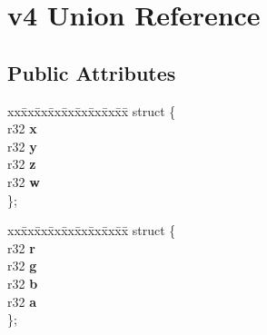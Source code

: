 \hypertarget{unionv4}{}\section{v4 Union Reference}
\label{unionv4}
\subsection*{Public Attributes}
\begin{DoxyCompactItemize}
\item 
\mbox{\label{unionv4_a963bc0946c0501381cd328461d5dbf99}} 
\begin{tabbing}
xx\=xx\=xx\=xx\=xx\=xx\=xx\=xx\=xx\=\kill
struct \{\\
\mbox{\label{unionv4_ad00dfb19fb170f64633ba38f8e05003c}} 
r32 {\bfseries x}\\
\mbox{\label{unionv4_a24527d2de19d9bd5f6a4d40cc74642ed}} 
r32 {\bfseries y}\\
\mbox{\label{unionv4_a9e524c0c55d5a00c3bb38a40ae09d89c}} 
r32 {\bfseries z}\\
\mbox{\label{unionv4_a94a432a243ae558de52da0cb34231152}} 
r32 {\bfseries w}\\
\}; \\

\end{tabbing}\item 
\mbox{\label{unionv4_aaf52d9980c797b6b3d980647e037b8bb}} 
\begin{tabbing}
xx\=xx\=xx\=xx\=xx\=xx\=xx\=xx\=xx\=\kill
struct \{\\
\mbox{\label{unionv4_a5443cce98e343c825d56f0ef357d03f6}} 
r32 {\bfseries r}\\
\mbox{\label{unionv4_aa57338767ef05342ad215cf4f55bad17}} 
r32 {\bfseries g}\\
\mbox{\label{unionv4_a1ab0658dd8a0546acd5471b267b2ba78}} 
r32 {\bfseries b}\\
\mbox{\label{unionv4_a495d4c0cfef3592c7affa1ad62c52f0a}} 
r32 {\bfseries a}\\
\}; \\


\end{tabbing}
\end{DoxyCompactItemize}

